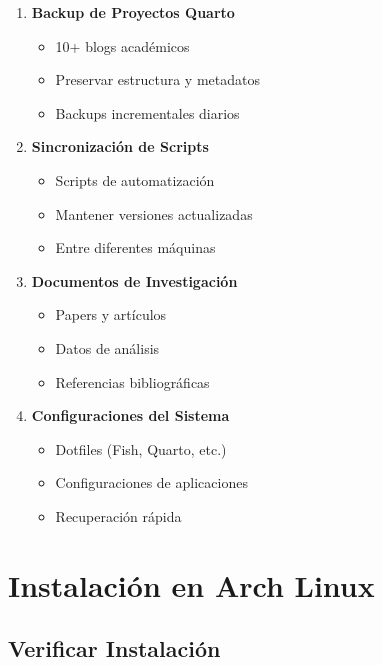 \documentclass[
  doc,
  floatsintext,
  longtable,
  a4paper,
  nolmodern,
  notxfonts,
  notimes,
  12pt,
  colorlinks=true,linkcolor=blue,citecolor=blue,urlcolor=blue]{apa7}
\providecommand{\tightlist}{%
  \setlength{\itemsep}{0pt}\setlength{\parskip}{0pt}}
\begin{document}
\begin{enumerate}
\def\labelenumi{\arabic{enumi}.}
\tightlist
\item
  \textbf{Backup de Proyectos Quarto}

  \begin{itemize}
  \tightlist
  \item
    10+ blogs académicos
  \item
    Preservar estructura y metadatos
  \item
    Backups incrementales diarios
  \end{itemize}
\item
  \textbf{Sincronización de Scripts}

  \begin{itemize}
  \tightlist
  \item
    Scripts de automatización
  \item
    Mantener versiones actualizadas
  \item
    Entre diferentes máquinas
  \end{itemize}
\item
  \textbf{Documentos de Investigación}

  \begin{itemize}
  \tightlist
  \item
    Papers y artículos
  \item
    Datos de análisis
  \item
    Referencias bibliográficas
  \end{itemize}
\item
  \textbf{Configuraciones del Sistema}

  \begin{itemize}
  \tightlist
  \item
    Dotfiles (Fish, Quarto, etc.)
  \item
    Configuraciones de aplicaciones
  \item
    Recuperación rápida
  \end{itemize}
\end{enumerate}

\section{Instalación en Arch Linux}\label{instalaciuxf3n-en-arch-linux}

\subsection{Verificar Instalación}\label{verificar-instalaciuxf3n}
\end{document}
